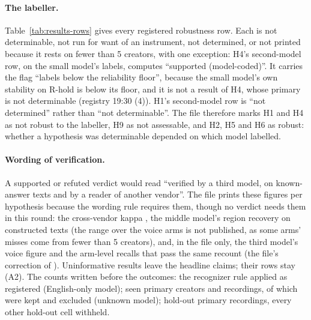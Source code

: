 \paragraph{The labeller.} Table~\ref{tab:results-rows} gives every registered robustness row. Each is not
determinable, not run for want of an instrument, not determined, or not printed because it rests on fewer than 5
creators, with one exception: H4's second-model row, on the small model's labels, computes ``supported
(model-coded)''. It carries the flag ``labels below the reliability floor'', because the small model's own stability on
R-hold is below its floor, and it is not a result of H4, whose primary is not determinable (registry 19:30 (4)). H1's
second-model row is ``not determined'' rather than ``not determinable''. The file therefore marks H1 and H4 as not
robust to the labeller, H9 as not assessable, and H2, H5 and H6 as robust: whether a hypothesis was determinable
depended on which model labelled.

\paragraph{Wording of verification.} A supported or refuted verdict would read ``verified by a third model, on
known-answer texts and by a reader of another vendor''. The file prints these figures per hypothesis because the
wording rule requires them, though no verdict needs them in this round: the cross-vendor kappa \VtrKappa, the middle
model's region recovery on constructed texts \KaRegionsMiddleRevThree{} (the range over the voice arms is not
published, as some arms' misses come from fewer than 5 creators), and, in the file only, the third model's voice figure
and the arm-level recalls that pass the same recount (the file's correction of \RecountStamp).
Uninformative results leave the headline claims; their rows stay (A2). The counts written before the outcomes: the
recognizer rule applied as registered (English-only model); seen primary \NSeen{} creators and \NSeenFiles{}
recordings, of which \NSeenEnglishOnly{} were kept and \NSeenOtherModel{} excluded (unknown model); hold-out primary
\HoldoutProdRecordings{} recordings, every other hold-out cell withheld.

\begin{table}[tp]
\centering
\small

\caption{First-round results on the hold-out, as the results file states them (model-coded): eligible creators of the
primary (amended) version against its minimum ($<$5, $<$min., $\geq$min.: a count stated against 5 or against the
minimum only); estimate with its 90\% creator interval (n.p.: not printed); Holm-adjusted $p$ of the larger of the two
versions' $p$; verdict under A10's guard; uninformative flag. $\dagger$: instrument below its floor (owner's exception,
A10.5). Claims in Table~\ref{tab:hypotheses}. \LabelValidity}
\label{tab:results}
\end{table}

